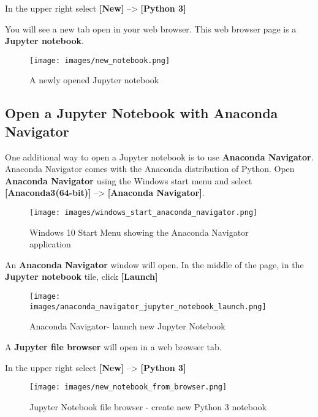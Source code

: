 \documentclass{book}
\makeatletter
\def\maxwidth{\ifdim\Gin@nat@width>\linewidth\linewidth
\else\Gin@nat@width\fi}
\let\Oldincludegraphics\includegraphics
\renewcommand{\includegraphics}[1]{\Oldincludegraphics[width=.8\maxwidth]{#1}}
\makeatother
\begin{document}
In the upper right select \textbf{{[}New{]}} --\textgreater{}
\textbf{{[}Python 3{]}}

You will see a new tab open in your web browser. This web browser page
is a \textbf{Jupyter notebook}.

\begin{figure}
\centering
\texttt{[image: images/new\_notebook.png]}
\caption{A newly opened Jupyter notebook}
\end{figure}
    




    
        \hypertarget{open-a-jupyter-notebook-with-anaconda-navigator}{%
\subsection{Open a Jupyter Notebook with Anaconda
Navigator}\label{open-a-jupyter-notebook-with-anaconda-navigator}}
    




    
        One additional way to open a Jupyter notebook is to use \textbf{Anaconda
Navigator}. Anaconda Navigator comes with the Anaconda distribution of
Python. Open \textbf{Anaconda Navigator} using the Windows start menu
and select \textbf{{[}Anaconda3(64-bit){]}} --\textgreater{}
\textbf{{[}Anaconda Navigator{]}}.

\begin{figure}
\centering
\texttt{[image: images/windows\_start\_anaconda\_navigator.png]}
\caption{Windows 10 Start Menu showing the Anaconda Navigator
application}
\end{figure}

An \textbf{Anaconda Navigator} window will open. In the middle of the
page, in the \textbf{Jupyter notebook} tile, click \textbf{{[}Launch{]}}

\begin{figure}
\centering
\texttt{[image: images/anaconda\_navigator\_jupyter\_notebook\_launch.png]}
\caption{Anaconda Navigator- launch new Jupyter Notebook}
\end{figure}

A \textbf{Jupyter file browser} will open in a web browser tab.

In the upper right select \textbf{{[}New{]}} --\textgreater{}
\textbf{{[}Python 3{]}}

\begin{figure}
\centering
\texttt{[image: images/new\_notebook\_from\_browser.png]}
\caption{Jupyter Notebook file browser - create new Python 3 notebook}
\end{figure}
\end{document}
